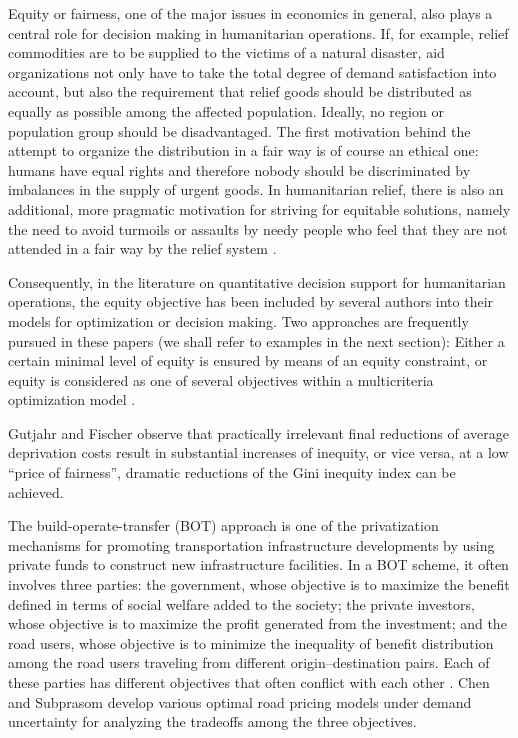 Equity or fairness, one of the major issues in economics in general, also plays a central role for decision making in humanitarian operations. If, for example, relief commodities are to be supplied to the victims of a natural disaster, aid organizations not only have to take the total degree of demand satisfaction into account, but also the requirement that relief goods should be distributed as equally as possible among the affected population. Ideally, no region or population group should be disadvantaged. The first motivation behind the attempt to organize the distribution in a fair way is of course an ethical one: humans have equal rights and therefore nobody should be discriminated by imbalances in the supply of urgent goods. In humanitarian relief, there is also an additional, more pragmatic motivation for striving for equitable solutions, namely the need to avoid turmoils or assaults by needy people who feel that they are not attended in a fair way by the relief system \cite{gutjahr2018equity}.

Consequently, in the literature on quantitative decision support for humanitarian operations, the equity objective has been included by several authors into their models for optimization or decision making. Two approaches are frequently pursued in these papers (we shall refer to examples in the next section): Either a certain minimal level of equity is ensured by means of an equity constraint, or equity is considered as one of several objectives within a multicriteria optimization model \cite{gutjahr2018equity}.

Gutjahr and Fischer \cite{gutjahr2018equity} observe that practically irrelevant final reductions of average deprivation costs result in substantial increases of inequity, or vice versa, at a low “price of fairness”, dramatic reductions of the Gini inequity index can be achieved.

The build-operate-transfer (BOT) approach is one of the privatization mechanisms for promoting transportation infrastructure developments by using private funds to construct new infrastructure facilities. In a BOT scheme, it often involves three parties: the government, whose objective is to maximize the benefit defined in terms of social welfare added to the society; the private investors, whose objective is to maximize the profit generated from the investment; and the road users, whose objective is to minimize the inequality of benefit distribution among the road users traveling from different origin–destination pairs. Each of these parties has different objectives that often conflict with each other \cite{chen2007analysis}. Chen and Subprasom \cite{chen2007analysis} develop various optimal road pricing models under demand uncertainty for analyzing the tradeoffs among the three objectives.

